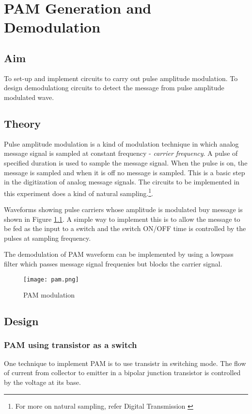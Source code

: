 \chapter[PAM Generation and Demodulation]{PAM Generation and Demodulation}

\section*{Aim}
To set-up and implement circuits to carry out pulse amplitude modulation. To design demodulationg circuits to detect the message from pulse amplitude modulated wave.
\section*{Theory}
Pulse amplitude modulation is a kind of modulation technique in which analog message signal is sampled at constant frequency - \emph{carrier frequency}. A pulse of specified duration is used to sample the message signal. When the pulse is on, the message is sampled and when it is off no message is sampled. This is a basic step in the digitization of analog message signals. The circuits to be implemented in this experiment does a kind of natural sampling.\footnote{For more on natural sampling, refer Digital Transmission \cite{Tomasi}}.

Waveforms showing pulse carriers whose amplitude is modulated buy message is shown in Figure \ref{PAMmod}. A simple way to implement this is to allow the message to be fed as the input to a switch and the switch ON/OFF time is controlled by the pulses at sampling frequency.

The demodulation of PAM waveform can be implemented by using a lowpass filter which passes message signal frequenies but blocks the carrier signal.
\begin{figure}[h]
\texttt{[image: pam.png]}
\caption{PAM modulation}
\label{PAMmod}
\end{figure}
\section*{Design}
\subsection*{PAM using transistor as a switch}
One technique to implement PAM is to use transistr in switching mode. The flow of current from collector to emitter in a bipolar junction transistor is controlled by the voltage at its base. 


